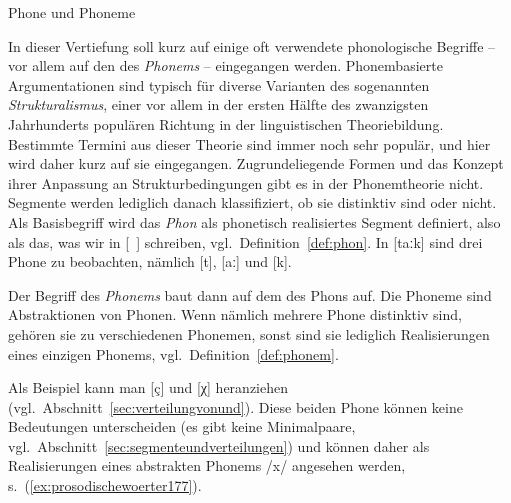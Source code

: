 
\begin{Vertiefung}{Phone und Phoneme}

\label{vert:phonephoneme}

\noindent In dieser Vertiefung soll kurz auf einige oft verwendete phonologische Begriffe -- vor allem auf den des \textit{Phonems} -- eingegangen werden.
Phonembasierte Argumentationen sind typisch für diverse Varianten des sogenannten \textit{Strukturalismus}, einer vor allem in der ersten Hälfte des zwanzigsten Jahrhunderts populären Richtung in der linguistischen Theoriebildung.
Bestimmte Termini aus dieser Theorie sind immer noch sehr populär, und hier wird daher kurz auf sie eingegangen.
Zugrundeliegende Formen und das Konzept ihrer Anpassung an Strukturbedingungen gibt es in der Phonemtheorie nicht.
Segmente werden lediglich danach klassifiziert, ob sie distinktiv sind oder nicht.
Als Basisbegriff wird das \textit{Phon} als phonetisch realisiertes Segment definiert, also als das, was wir in [~] schreiben, vgl.\ Definition~\ref{def:phon}.
In [taːk] sind drei Phone zu beobachten, nämlich [t], [aː] und [k].


Der Begriff des \textit{Phonems} baut dann auf dem des Phons auf.
Die Phoneme sind Abstraktionen von Phonen.
Wenn nämlich mehrere Phone distinktiv sind, gehören sie zu verschiedenen Phonemen, sonst sind sie lediglich Realisierungen eines einzigen Phonems, vgl.\ Definition~\ref{def:phonem}.


Als Beispiel kann man [ç] und [χ] heranziehen (vgl.\ Abschnitt~\ref{sec:verteilungvonund}).
Diese beiden Phone können keine Bedeutungen unterscheiden (es gibt keine Minimalpaare, vgl.\ Abschnitt~\ref{sec:segmenteundverteilungen}) und können daher als Realisierungen eines abstrakten Phonems /x/ angesehen werden, s.\ (\ref{ex:prosodischewoerter177}).


\end{Vertiefung}
